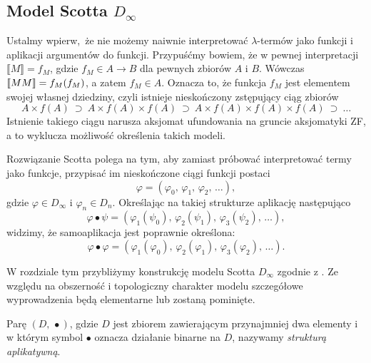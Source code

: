 \subsection{Model Scotta \(D_\infty\)}
Ustalmy wpierw, że nie możemy naiwnie interpretować \(\lambda\)-termów jako funkcji i aplikacji argumentów do funkcji. Przypuśćmy bowiem, że w pewnej interpretacji \(\llbracket M \rrbracket=f_M\), gdzie \(f_M \in A\to B\) dla pewnych zbiorów \(A\) i \(B\). Wówczas \(\llbracket M M\rrbracket=\nobreak f_M(f_M)\), a zatem \(f_M\in A\). Oznacza to, że funkcja \(f_M\) jest elementem swojej własnej dziedziny, czyli istnieje nieskończony zstępujący ciąg zbiorów \[A\times f(A)\ \supset\ A\times f(A)\times f(A)\ \supset\ A\times f(A)\times f(A)\times f(A)\ \supset\ \dots\] Istnienie takiego ciągu narusza aksjomat ufundowania na gruncie aksjomatyki ZF, a to wyklucza możliwość określenia takich modeli.

Rozwiązanie Scotta polega na tym, aby zamiast próbować interpretować termy jako funkcje, przypisać im nieskończone ciągi funkcji postaci 
\[
  \varphi = (\varphi_0,\,\varphi_1,\,\varphi_2,\,\dots),
\]
gdzie \(\varphi \in D_\infty\) i \(\varphi_n\in D_n\). Określając na takiej strukturze aplikację następująco
\[
  \varphi\bullet\psi = (\varphi_1(\psi_0),\,\varphi_2(\psi_1),\,\varphi_3(\psi_2),\,\dots),
\]
widzimy, że samoaplikacja jest poprawnie określona: 
\[
  \varphi\bullet\varphi = (\varphi_1(\varphi_0),\,\varphi_2(\varphi_1),\,\varphi_3(\varphi_2),\,\dots).
\]

W rozdziale tym przybliżymy konstrukcję modelu Scotta \(D_\infty\) zgodnie z \cite[Rozdział 16]{Hindley:2008:LCI:1388400}. Ze względu na obszerność i topologiczny charakter modelu szczegółowe wyprowadzenia będą elementarne lub zostaną pominięte.

\begin{definicja}
Parę \((D,\, \bullet)\), gdzie \(D\) jest zbiorem zawierającym przynajmniej dwa elementy i w którym symbol \(\bullet\) oznacza działanie binarne na \(D\), nazywamy \emph{strukturą aplikatywną}.
\end{definicja}

